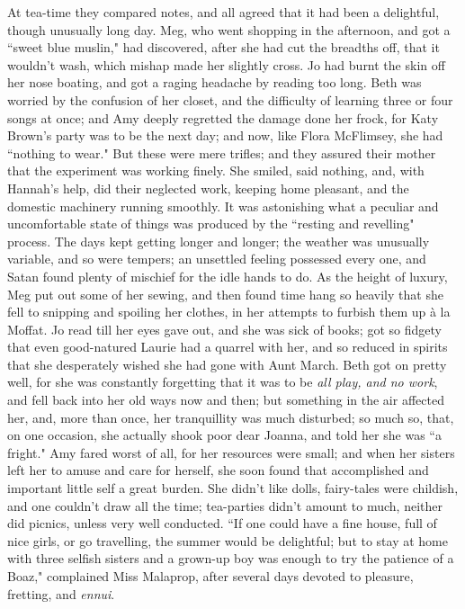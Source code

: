 At tea-time they compared notes, and all agreed that it had been a
delightful, though unusually long day. Meg, who went shopping in the
afternoon, and got a ``sweet blue muslin," had discovered, after she had
cut the breadths off, that it wouldn't wash, which
mishap made her slightly cross. Jo had burnt the skin off her nose
boating, and got a raging headache by reading too long. Beth was worried
by the confusion of her closet, and the difficulty of learning three or
four songs at once; and Amy deeply regretted the damage done her frock,
for Katy Brown's party was to be the next day; and now,
like Flora McFlimsey, she had ``nothing to wear." But these were mere
trifles; and they assured their mother that the experiment was working
finely. She smiled, said nothing, and, with Hannah's
help, did their neglected work, keeping home pleasant, and the domestic
machinery running smoothly. It was astonishing what a peculiar and
uncomfortable state of things was produced by the ``resting and
revelling" process. The days kept getting longer and longer; the weather
was unusually variable, and so were tempers; an unsettled feeling
possessed every one, and Satan found plenty of mischief for the idle
hands to do. As the height of luxury, Meg put out some of her sewing,
and then found time hang so heavily that she fell to snipping and
spoiling her clothes, in her attempts to furbish them up à la Moffat. Jo
read till her eyes gave out, and she was sick of books; got so fidgety
that even good-natured Laurie had a quarrel with her, and so reduced in
spirits that she desperately wished she had gone with Aunt March. Beth
got on pretty well, for she was constantly forgetting that it was to be
\emph{all play, and no work}, and fell back into her old ways now and
then; but something in the air affected her, and, more than once, her
tranquillity was much disturbed; so much so, that, on one occasion, she
actually shook poor dear Joanna, and told her she was ``a fright." Amy
fared worst of all, for her resources were small; and when her sisters
left her to amuse and care for herself, she soon found that accomplished
and important little self a great burden. She didn't
like dolls, fairy-tales were childish, and one couldn't
draw all the time; tea-parties didn't amount to much,
neither did picnics, unless very well conducted. ``If one could have a
fine house, full of nice girls, or go travelling, the summer would be
delightful; but to stay at home with three selfish sisters and a
grown-up boy was enough to try the patience of a Boaz," complained Miss
Malaprop, after several days devoted to pleasure, fretting, and
\emph{ennui}.

